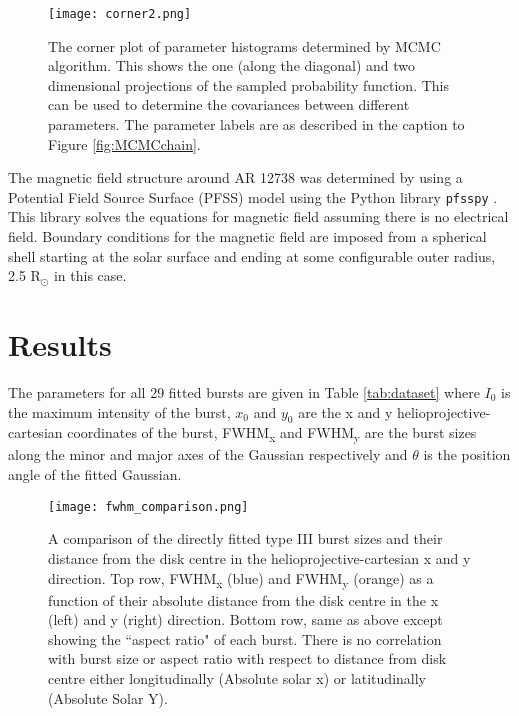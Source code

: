 \begin{figure}
\centering
\texttt{[image: corner2.png]}
\caption[A corner plot of parameter histograms determined by MCMC algorithm.]{The corner plot of parameter histograms determined by MCMC algorithm. This shows the one (along the diagonal) and two dimensional projections of the sampled probability function. This can be used to determine the covariances between different parameters. The parameter labels are as described in the caption to Figure \ref{fig:MCMCchain}.}
\label{fig:MCMCcorner}
\end{figure}

The magnetic field structure around AR 12738 was determined by using a Potential Field Source Surface (PFSS) model using the Python library \texttt{pfsspy} \citep{Stansby2020}. This library solves the equations for magnetic field assuming there is no electrical field. Boundary conditions for the magnetic field are imposed from a spherical shell starting at the solar surface and ending at some configurable outer radius, 2.5 R$_\odot$ in this case.


\section{Results}
\label{sec:obsvtheory_results}
The parameters for all 29 fitted bursts are given in Table \ref{tab:dataset} where $I_0$ is the maximum intensity of the burst, $x_0$ and $y_0$ are the x and y  helioprojective-cartesian coordinates of the burst, FWHM\textsubscript{x} and FWHM\textsubscript{y} are the burst sizes along the minor and major axes of the Gaussian respectively and $\theta$ is the position angle of the fitted Gaussian. %

\begin{figure}
\centering
\texttt{[image: fwhm\_comparison.png]}
\caption[Directly fitted type III burst sizes as a function of position relative to disk centre.]{A comparison of the directly fitted type III burst sizes and their distance from the disk centre in the helioprojective-cartesian x and y direction. Top row, FWHM\textsubscript{x} (blue) and FWHM\textsubscript{y} (orange) as a function of their absolute distance from the disk centre in the x (left) and y (right) direction. Bottom row, same as above except showing the ``aspect ratio" of each burst. There is no correlation with burst size or aspect ratio with respect to distance from disk centre either longitudinally (Absolute solar x) or latitudinally (Absolute Solar Y).}
\label{fig:fwhm_comp}
\end{figure}


